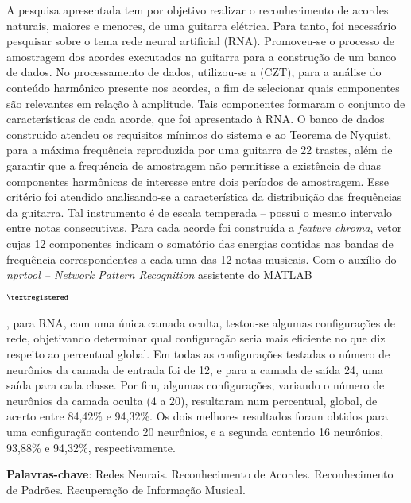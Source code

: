 \begin{resumo}
 
A pesquisa apresentada tem por objetivo realizar o reconhecimento de acordes naturais, maiores e menores, de uma guitarra elétrica. Para tanto, foi necessário pesquisar sobre o tema rede neural artificial (RNA). Promoveu-se o processo de amostragem dos acordes executados na guitarra para a construção de um banco de dados. No processamento de dados, utilizou-se a  (CZT), para a análise do conteúdo harmônico presente nos acordes, a fim de selecionar quais componentes são relevantes em relação à amplitude. Tais componentes formaram o conjunto de características de cada acorde, que foi apresentado à RNA. O banco de dados construído atendeu os requisitos mínimos do sistema e ao Teorema de Nyquist, para a máxima frequência reproduzida por uma guitarra de 22 trastes, além de garantir que a frequência de amostragem não permitisse a existência de duas componentes harmônicas de interesse entre dois períodos de amostragem. Esse critério foi atendido analisando-se a característica da distribuição das frequências da guitarra. Tal instrumento é de escala temperada – possui o mesmo intervalo entre notas consecutivas. Para cada acorde foi construída a \textit{feature chroma}, vetor cujas 12 componentes indicam o somatório das energias contidas nas bandas de frequência correspondentes a cada uma das 12 notas musicais. Com o auxílio do \textit{nprtool – Network Pattern Recognition} assistente do MATLAB\begin{footnotesize}$^{\textregistered}$\end{footnotesize}, para RNA, com uma única camada oculta, testou-se algumas configurações de rede, objetivando determinar qual configuração seria mais eficiente no que diz respeito ao percentual global. Em todas as configurações testadas o número de neurônios da camada de entrada foi de 12, e para a camada de saída 24, uma saída para cada classe. Por fim, algumas configurações, variando o número de neurônios da camada oculta (4 a 20), resultaram num percentual, global, de acerto entre 84,42\%  e 94,32\%. Os dois melhores resultados foram obtidos para uma configuração contendo 20 neurônios, e a segunda contendo 16 neurônios, 93,88\% e 94,32\%, respectivamente.
 
 

 \textbf{Palavras-chave}: Redes Neurais. Reconhecimento de Acordes. Reconhecimento de Padrões. Recuperação de Informação Musical.
\end{resumo}

